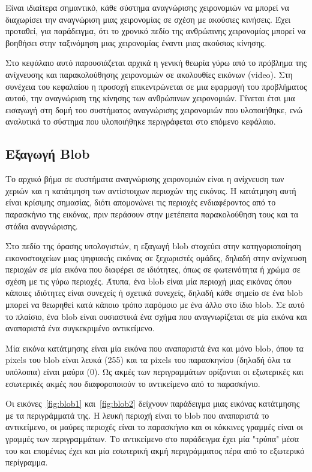 Είναι ιδιαίτερα σημαντικό, κάθε σύστημα αναγνώρισης χειρονομιών να μπορεί να διαχωρίσει την αναγνώριση μιας χειρονομίας σε σχέση με ακούσιες κινήσεις. Έχει προταθεί, για παράδειγμα, ότι το χρονικό πεδίο της ανθρώπινης χειρονομίας μπορεί να βοηθήσει στην ταξινόμηση μιας χειρονομίας έναντι μιας ακούσιας κίνησης. 



Στο κεφάλαιο αυτό παρουσιάζεται αρχικά η γενική θεωρία γύρω από το πρόβλημα της ανίχνευσης και παρακολούθησης χειρονομιών σε ακολουθίες εικόνων (video). Στη συνέχεια του κεφαλαίου η προσοχή επικεντρώνεται σε μια εφαρμογή του προβλήματος αυτού, την αναγνώριση της κίνησης των ανθρώπινων χειρονομιών. Γίνεται έτσι μια εισαγωγή στη δομή του συστήματος αναγνώρισης χειρονομιών που υλοποιήθηκε, ενώ αναλυτικά το σύστημα που υλοποιήθηκε περιγράφεται στο επόμενο κεφάλαιο.


\subsection{Εξαγωγή Blob}

Το αρχικό βήμα σε συστήματα αναγνώρισης χειρονομιών είναι η ανίχνευση των χεριών και η κατάτμηση των αντίστοιχων περιοχών της εικόνας. Η κατάτμηση αυτή είναι κρίσιμης σημασίας, διότι απομονώνει τις περιοχές ενδιαφέροντος από το παρασκήνιο της εικόνας, πριν περάσουν στην μετέπειτα παρακολούθηση τους και τα στάδια αναγνώρισης.


Στο πεδίο της όρασης υπολογιστών, η εξαγωγή blob στοχεύει στην κατηγοριοποίηση εικονοστοιχείων μιας ψηφιακής εικόνας σε ξεχωριστές ομάδες, δηλαδή στην ανίχνευση περιοχών σε μία εικόνα που διαφέρει σε ιδιότητες, όπως σε φωτεινότητα ή χρώμα σε σχέση με τις γύρω περιοχές. Άτυπα, ένα blob είναι μία περιοχή μιας εικόνας όπου κάποιες ιδιότητες είναι συνεχείς ή σχετικά συνεχείς, δηλαδή κάθε σημείο σε ένα blob μπορεί να θεωρηθεί κατά κάποιο τρόπο παρόμοιο με ένα άλλο στο ίδιο blob. Σε αυτό το πλαίσιο, ένα blob είναι ουσιαστικά ένα σχήμα που αναγνωρίζεται σε μία εικόνα και αναπαριστά ένα συγκεκριμένο αντικείμενο.


Μία εικόνα κατάτμησης είναι μία εικόνα που αναπαριστά ένα και μόνο blob, όπου τα pixels του blob είναι λευκά (255) και τα pixels του παρασκηνίου (δηλαδή όλα τα υπόλοιπα) είναι μαύρα (0). Ως ακμές των περιγραμμάτων ορίζονται οι εξωτερικές και εσωτερικές ακμές που διαφοροποιούν το αντικείμενο από το παρασκήνιο. 

Οι εικόνες~\ref{fig:blob1} και~\ref{fig:blob2} δείχνουν παράδειγμα μιας εικόνας κατάτμησης με τα περιγράμματά της. Η λευκή περιοχή είναι το blob που αναπαριστά το αντικείμενο, οι μαύρες περιοχές είναι το παρασκήνιο και οι κόκκινες γραμμές είναι οι γραμμές των περιγραμμάτων. Το αντικείμενο στο παράδειγμα έχει μία "τρύπα" μέσα του και επομένως έχει και μία εσωτερική ακμή περιγράμματος πέρα από το εξωτερικό περίγραμμα. 



